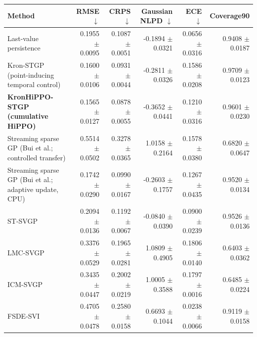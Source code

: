 \begin{tabular}{lrrrrr}
\toprule
Method & RMSE $\downarrow$ & CRPS $\downarrow$ & Gaussian NLPD $\downarrow$ & ECE $\downarrow$ & Coverage90 \\
\midrule
Last-value persistence & 0.1955 $\pm$ 0.0095 & 0.1087 $\pm$ 0.0051 & -0.1894 $\pm$ 0.0321 & 0.0656 $\pm$ 0.0316 & 0.9408 $\pm$ 0.0187 \\
Kron-STGP (point-inducing temporal control) & 0.1600 $\pm$ 0.0106 & 0.0931 $\pm$ 0.0044 & -0.2811 $\pm$ 0.0326 & 0.1586 $\pm$ 0.0208 & 0.9709 $\pm$ 0.0123 \\
\textbf{KronHiPPO-STGP (cumulative HiPPO)} & 0.1565 $\pm$ 0.0127 & 0.0878 $\pm$ 0.0055 & -0.3652 $\pm$ 0.0441 & 0.1210 $\pm$ 0.0316 & 0.9601 $\pm$ 0.0230 \\
Streaming sparse GP (Bui et al.; controlled transfer) & 0.5514 $\pm$ 0.0502 & 0.3278 $\pm$ 0.0365 & 1.0158 $\pm$ 0.2164 & 0.1578 $\pm$ 0.0380 & 0.6820 $\pm$ 0.0647 \\
Streaming sparse GP (Bui et al.; adaptive update, CPU) & 0.1742 $\pm$ 0.0290 & 0.0990 $\pm$ 0.0167 & -0.2603 $\pm$ 0.1757 & 0.1267 $\pm$ 0.0435 & 0.9520 $\pm$ 0.0134 \\
ST-SVGP & 0.2094 $\pm$ 0.0136 & 0.1192 $\pm$ 0.0067 & -0.0840 $\pm$ 0.0390 & 0.0900 $\pm$ 0.0239 & 0.9526 $\pm$ 0.0136 \\
LMC-SVGP & 0.3376 $\pm$ 0.0529 & 0.1965 $\pm$ 0.0281 & 1.0809 $\pm$ 0.4905 & 0.1806 $\pm$ 0.0140 & 0.6403 $\pm$ 0.0362 \\
ICM-SVGP & 0.3435 $\pm$ 0.0447 & 0.2002 $\pm$ 0.0219 & 1.0005 $\pm$ 0.3588 & 0.1797 $\pm$ 0.0016 & 0.6485 $\pm$ 0.0224 \\
FSDE-SVI & 0.4705 $\pm$ 0.0478 & 0.2580 $\pm$ 0.0158 & 0.6693 $\pm$ 0.1044 & 0.0238 $\pm$ 0.0066 & 0.9119 $\pm$ 0.0158 \\
\bottomrule
\end{tabular}
